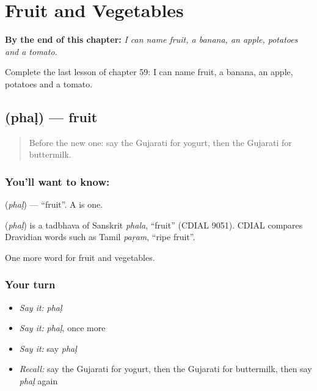 
\chapter{Fruit and Vegetables}
\label{ch:gu-fruit-and-vegetables}

\begin{chapteropening}
\textbf{By the end of this chapter:} \emph{I can name fruit, a banana, an apple, potatoes and a tomato.}

Complete the last lesson of chapter 59: I can name fruit, a banana, an apple, potatoes and a tomato.
\end{chapteropening}

\section[\texorpdfstring{\gu{ફળ} (phaḷ)}{ફળ (phaḷ)}]{ (phaḷ) — fruit}

\label{lesson:GU-C59-fruit}



\begin{quote}
Before the new one: say the Gujarati for yogurt, then the Gujarati for buttermilk.
\end{quote}

\subsection*{You'll want to know: }
\textbf{} (\emph{phaḷ}) — \textquotedblleft{}fruit\textquotedblright{}. A \textbf{} is one.

\begin{cousinweb}
\textbf{} (\emph{phaḷ}) is a tadbhava of Sanskrit \emph{phala}, \textquotedblleft{}fruit\textquotedblright{} (CDIAL 9051). CDIAL compares Dravidian words such as Tamil \emph{paṛam}, \textquotedblleft{}ripe fruit\textquotedblright{}.
\end{cousinweb}

\begin{grammarlens}[title={What you've built}]
One more word for fruit and vegetables.
\end{grammarlens}

\subsection*{Your turn}
\begin{itemize}
\raggedright
  \item \emph{Say it:} \emph{phaḷ}
  \item \emph{Say it:} \emph{phaḷ}, once more
  \item \emph{Say it:} say \emph{phaḷ}
  \item \emph{Recall:} say the Gujarati for yogurt, then the Gujarati for buttermilk, then say \emph{phaḷ} again
\end{itemize}

